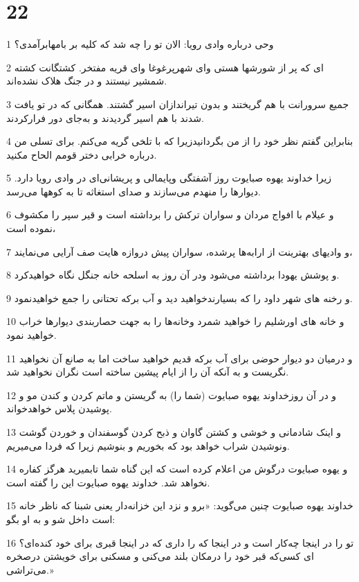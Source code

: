 \chapter{22}

\par 1 وحی درباره وادی رویا: الان تو را چه شد که کلیه بر بامهابرآمدی؟
\par 2 ‌ای که پر از شورشها هستی و‌ای شهرپرغوغا و‌ای قریه مفتخر. کشتگانت کشته شمشیر نیستند و در جنگ هلاک نشده‌اند.
\par 3 جمیع سرورانت با هم گریختند و بدون تیراندازان اسیر گشتند. همگانی که در تو یافت شدند با هم اسیر گردیدند و به‌جای دور فرارکردند.
\par 4 بنابراین گفتم نظر خود را از من بگردانیدزیرا که با تلخی گریه می‌کنم. برای تسلی من درباره خرابی دختر قومم الحاح مکنید.
\par 5 زیرا خداوند یهوه صبایوت روز آشفتگی وپایمالی و پریشانی‌ای در وادی رویا دارد. دیوارها را منهدم می‌سازند و صدای استغاثه تا به کوهها می‌رسد.
\par 6 و عیلام با افواج مردان و سواران ترکش را برداشته است و قیر سپر را مکشوف نموده است،
\par 7 و وادیهای بهترینت از ارابه‌ها پرشده، سواران پیش دروازه هایت صف آرایی می‌نمایند،
\par 8 و پوشش یهودا برداشته می‌شود ودر آن روز به اسلحه خانه جنگل نگاه خواهیدکرد.
\par 9 و رخنه های شهر داود را که بسیارندخواهید دید و آب برکه تحتانی را جمع خواهیدنمود.
\par 10 و خانه های اورشلیم را خواهید شمرد وخانه‌ها را به جهت حصاربندی دیوارها خراب خواهید نمود.
\par 11 و درمیان دو دیوار حوضی برای آب برکه قدیم خواهید ساخت اما به صانع آن نخواهید نگریست و به آنکه آن را از ایام پیشین ساخته است نگران نخواهید شد.
\par 12 و در آن روزخداوند یهوه صبایوت (شما را) به گریستن و ماتم کردن و کندن مو و پوشیدن پلاس خواهدخواند.
\par 13 و اینک شادمانی و خوشی و کشتن گاوان و ذبح کردن گوسفندان و خوردن گوشت ونوشیدن شراب خواهد بود که بخوریم و بنوشیم زیرا که فردا می‌میریم.
\par 14 و یهوه صبایوت درگوش من اعلام کرده است که این گناه شما تابمیرید هرگز کفاره نخواهد شد. خداوند یهوه صبایوت این را گفته است.
\par 15 خداوند یهوه صبایوت چنین می‌گوید: «برو و نزد این خزانه‌دار یعنی شبنا که ناظر خانه است داخل شو و به او بگو:
\par 16 تو را در اینجا چه‌کار است و در اینجا که را داری که در اینجا قبری برای خود کنده‌ای؟ ای کسی‌که قبر خود را درمکان بلند می‌کنی و مسکنی برای خویشتن درصخره می‌تراشی.»
